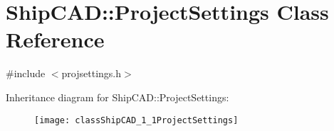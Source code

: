 \hypertarget{classShipCAD_1_1ProjectSettings}{}\section{Ship\+C\+AD\+:\+:Project\+Settings Class Reference}
\label{classShipCAD_1_1ProjectSettings}


{\ttfamily \#include $<$projsettings.\+h$>$}

Inheritance diagram for Ship\+C\+AD\+:\+:Project\+Settings\+:\begin{figure}[H]
\begin{center}
\leavevmode
\texttt{[image: classShipCAD\_1\_1ProjectSettings]}
\end{center}
\end{figure}

